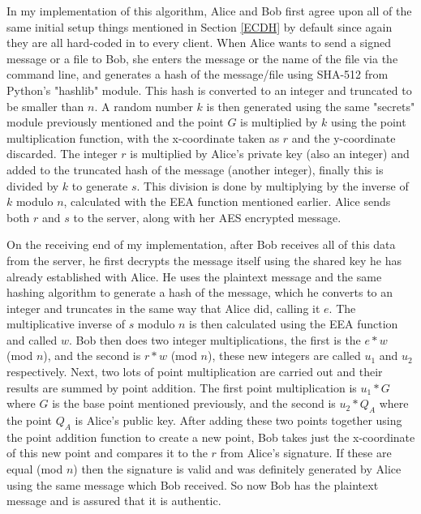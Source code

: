 \documentclass[12pt,a4paper]{article}
\begin{document}
In my implementation of this algorithm, Alice and Bob first agree upon all of the same initial setup things mentioned in Section \ref{ECDH} 
by default since again they are all hard-coded in to every client. 
When Alice wants to send a signed message or a file to Bob, she enters the message or the name of the file via the command line, 
and generates a hash of the message/file using SHA-512 from Python's "hashlib" module. 
This hash is converted to an integer and truncated to be smaller than $n$. 
A random number $k$ is then generated using the same "secrets" module previously mentioned and the point $G$ is multiplied by $k$ using 
the point multiplication function, with the x-coordinate taken as $r$ and the y-coordinate discarded. 
The integer $r$ is multiplied by Alice's private key (also an integer) and added to the truncated hash of the message (another integer), 
finally this is divided by $k$ to generate $s$. 
This division is done by multiplying by the inverse of $k$ modulo $n$, calculated with the EEA function mentioned earlier. 
Alice sends both $r$ and $s$ to the server, along with her AES encrypted message. 

On the receiving end of my implementation, after Bob receives all of this data from the server, 
he first decrypts the message itself using the shared key he has already established with Alice. 
He uses the plaintext message and the same hashing algorithm to generate a hash of the message, 
which he converts to an integer and truncates in the same way that Alice did, calling it $e$. 
The multiplicative inverse of $s$ modulo $n$ is then calculated using the EEA function and called $w$. 
Bob then does two integer multiplications, the first is the $e*w$ (mod $n$), 
and the second is $r*w$ (mod $n$), these new integers are called $u_1$ and $u_2$ respectively. 
Next, two lots of point multiplication are carried out and their results are summed by point addition. 
The first point multiplication is $u_1*G$ where $G$ is the base point mentioned previously, 
and the second is $u_2*Q_A$ where the point $Q_A$ is Alice's public key. 
After adding these two points together using the point addition function to create a new point, 
Bob takes just the x-coordinate of this new point and compares it to the $r$ from Alice's signature. 
If these are equal (mod $n$) then the signature is valid and was definitely generated by Alice using the same message which Bob received. 
So now Bob has the plaintext message and is assured that it is authentic. 
\end{document}
